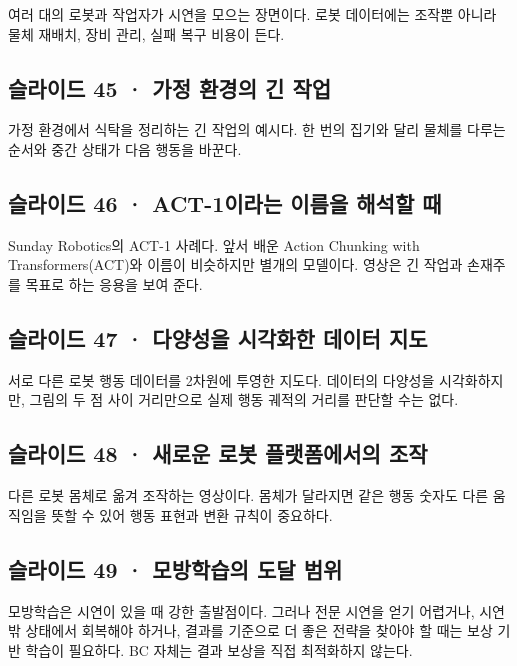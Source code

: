 \documentclass[11pt,a4paper]{article}
\begin{document}
여러 대의 로봇과 작업자가 시연을 모으는 장면이다. 로봇 데이터에는 조작뿐 아니라 물체 재배치, 장비 관리, 실패 복구 비용이 든다.\par

\subsection{슬라이드 45 · 가정 환경의 긴 작업}

가정 환경에서 식탁을 정리하는 긴 작업의 예시다. 한 번의 집기와 달리 물체를 다루는 순서와 중간 상태가 다음 행동을 바꾼다.\par

\subsection{슬라이드 46 · ACT-1이라는 이름을 해석할 때}

Sunday Robotics의 ACT-1 사례다. 앞서 배운 Action Chunking with Transformers(ACT)와 이름이 비슷하지만 별개의 모델이다. 영상은 긴 작업과 손재주를 목표로 하는 응용을 보여 준다.\par

\subsection{슬라이드 47 · 다양성을 시각화한 데이터 지도}

서로 다른 로봇 행동 데이터를 2차원에 투영한 지도다. 데이터의 다양성을 시각화하지만, 그림의 두 점 사이 거리만으로 실제 행동 궤적의 거리를 판단할 수는 없다.\par

\subsection{슬라이드 48 · 새로운 로봇 플랫폼에서의 조작}

다른 로봇 몸체로 옮겨 조작하는 영상이다. 몸체가 달라지면 같은 행동 숫자도 다른 움직임을 뜻할 수 있어 행동 표현과 변환 규칙이 중요하다.\par

\subsection{슬라이드 49 · 모방학습의 도달 범위}

모방학습은 시연이 있을 때 강한 출발점이다. 그러나 전문 시연을 얻기 어렵거나, 시연 밖 상태에서 회복해야 하거나, 결과를 기준으로 더 좋은 전략을 찾아야 할 때는 보상 기반 학습이 필요하다. BC 자체는 결과 보상을 직접 최적화하지 않는다.\par
\end{document}
